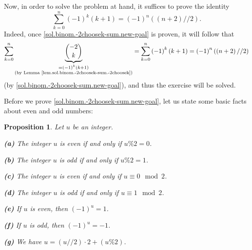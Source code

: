 \documentclass[paper=a4, fontsize=12pt]{scrartcl}%
\let\sumnonlimits\sum
\renewcommand{\sum}{\sumnonlimits\limits}
\theoremstyle{plainsl}
\newtheorem{proposition}[theorem]{Proposition}
\theoremstyle{definition}
\theoremstyle{remark}
\begin{document}
Now, in order to solve the problem at hand, it suffices to prove the identity%
\begin{equation}
\sum_{k=0}^{n}\left(  -1\right)  ^{k}\left(  k+1\right)  =\left(  -1\right)
^{n}\left(  \left(  n+2\right)  //2\right)  .
\label{sol.binom.-2choosek-sum.new-goal}%
\end{equation}
Indeed, once \eqref{sol.binom.-2choosek-sum.new-goal} is proven, it will
follow that%
\[
\sum_{k=0}^{n}\underbrace{\dbinom{-2}{k}}_{\substack{=\left(  -1\right)
^{k}\left(  k+1\right)  \\\text{(by Lemma
\ref{lem.sol.binom.-2choosek-sum.-2choosek})}}}=\sum_{k=0}^{n}\left(
-1\right)  ^{k}\left(  k+1\right)  =\left(  -1\right)  ^{n}\left(  \left(
n+2\right)  //2\right)
\]
(by \eqref{sol.binom.-2choosek-sum.new-goal}), and thus the exercise will be solved.

Before we prove \eqref{sol.binom.-2choosek-sum.new-goal}, let us state some
basic facts about even and odd numbers:

\begin{proposition}
\label{prop.sol.binom.-2choosek-sum.evod}Let $u$ be an integer.

\textbf{(a)} The integer $u$ is even if and only if $u\%2=0$.

\textbf{(b)} The integer $u$ is odd if and only if $u\%2=1$.

\textbf{(c)} The integer $u$ is even if and only if $u\equiv0\mod 2$.

\textbf{(d)} The integer $u$ is odd if and only if $u\equiv1\mod 2$.

\textbf{(e)} If $u$ is even, then $\left(  -1\right)  ^{u}=1$.

\textbf{(f)} If $u$ is odd, then $\left(  -1\right)  ^{u}=-1$.

\textbf{(g)} We have $u=\left(  u//2\right)  \cdot2+\left(  u\%2\right)  $.
\end{proposition}
\end{document}

